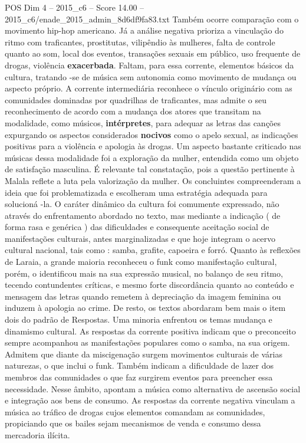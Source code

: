 \begin{textsample}{POS Dim 4 – 2015\_c6 – Score 14.00 – 2015\_c6/enade\_2015\_admin\_8d6df9fa83.txt}
Também ocorre comparação com o movimento hip-hop americano.
Já a análise negativa prioriza a vinculação do ritmo com traficantes, prostitutas, vilipêndio às mulheres, falta de controle quanto ao som, local dos eventos, transações sexuais em público, uso frequente de drogas, violência \textbf{exacerbada}.
Faltam, para essa corrente, elementos básicos da cultura, tratando -se de música sem autonomia como movimento de mudança ou aspecto próprio.
A corrente intermediária reconhece o vínculo originário com as comunidades dominadas por quadrilhas de traficantes, mas admite o seu reconhecimento de acordo com a mudança dos atores que transitam na modalidade, como músicos, \textbf{intérpretes}, para adequar as letras das canções expurgando os aspectos considerados \textbf{nocivos} como o apelo sexual, as indicações positivas para a violência e apologia às drogas.
Um aspecto bastante criticado nas músicas dessa modalidade foi a exploração da mulher, entendida como um objeto de satisfação masculina.
É relevante tal constatação, pois a questão pertinente à Malala reflete a luta pela valorização da mulher.
Os concluintes compreenderam a ideia que foi problematizada e escolheram uma estratégia adequada para solucioná -la.
O caráter dinâmico da cultura foi comumente expressado, não através do enfrentamento abordado no texto, mas mediante a indicação ( de forma rasa e genérica ) das dificuldades e consequente aceitação social de manifestações culturais, antes marginalizadas e que hoje integram o acervo cultural nacional, tais como : samba, grafite, capoeira e forró.
Quanto às reflexões de Laraia, a grande maioria reconheceu o funk como manifestação cultural, porém, o identificou mais na sua expressão musical, no balanço de seu ritmo, tecendo contundentes críticas, e mesmo forte discordância quanto ao conteúdo e mensagem das letras quando remetem à depreciação da imagem feminina ou induzem à apologia ao crime.
De resto, os textos abordaram bem mais o item dois do padrão de Respostas.
Uma minoria enfrentou os temas mudança e dinamismo cultural.
As respostas da corrente positiva indicam que o preconceito sempre acompanhou as manifestações populares como o samba, na sua origem.
Admitem que diante da miscigenação surgem movimentos culturais de várias naturezas, o que inclui o funk.
Também indicam a dificuldade de lazer dos membros das comunidades o que faz surgirem eventos para preencher essa necessidade.
Nesse âmbito, apontam a música como alternativa de ascensão social e integração aos bens de consumo.
As respostas da corrente negativa vinculam a música ao tráfico de drogas cujos elementos comandam as comunidades, propiciando que os bailes sejam mecanismos de venda e consumo dessa mercadoria ilícita.

\end{textsample}
